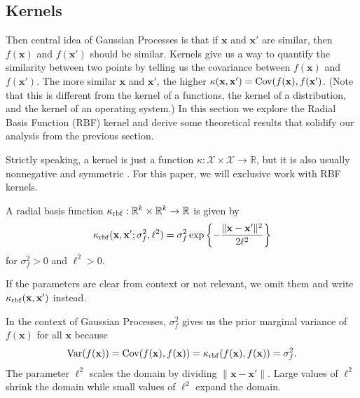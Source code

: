 \subsection{Kernels}

Then central idea of Gaussian Processes is that if $\mathbf{x}$ and $\mathbf{x}'$ are similar, then $f(\mathbf{x})$ and $f(\mathbf{x}')$ should be similar.
Kernels give us a way to quantify the similarity between two points by telling us the covariance between $f(\mathbf{x})$ and $f(\mathbf{x}')$.
The more similar $\mathbf{x}$ and $\mathbf{x}'$, the higher $\kappa(\mathbf{x}, \mathbf{x}') = \operatorname{Cov}(f(\mathbf{x}), f(\mathbf{x}')$.
(Note that this is different from the kernel of a functions, the kernel of a distribution, and the kernel of an operating system.)
In this section we explore the Radial Basis Function (RBF) kernel and derive some theoretical results that solidify our analysis from the previous section.

Strictly speaking, a kernel is just a function $\kappa: \mathcal{X} \times \mathcal{X} \to \mathbb{R}$, but it is also usually nonnegative and symmetric \cite{murphy2012}.
For this paper, we will exclusive work with RBF kernels.

\begin{definition}
    A radial basis function $\kappa_{\mathrm{rbf}}: \mathbb{R}^{k} \times \mathbb{R}^{k} \to \mathbb{R}$
    is given by
    \begin{equation*}
        \kappa_{\mathrm{rbf}}(\mathbf{x}, \mathbf{x}'; \sigma_f^2, \ell^2)
        = \sigma_f^{2} \exp \left\{ - \frac{ \lVert \mathbf{x} - \mathbf{x}' \rVert^2 }{ 2 \ell^2 }\right\}
    \end{equation*}
    for $\sigma_f^2 > 0$ and $\ell^2 > 0$.

    If the parameters are clear from context or not relevant, we omit them and write $\kappa_{\mathrm{rbf}}(\mathbf{x}, \mathbf{x}')$ instead.
\end{definition}
In the context of Gaussian Processes, $\sigma_f^2$ gives us the prior marginal variance of $f(\mathbf{x})$ for all $\mathbf{x}$ because
\begin{equation*}
    \operatorname{Var}(f(\mathbf{x})) = \operatorname{Cov}(f(\mathbf{x}), f(\mathbf{x})) = \kappa_{\mathrm{rbf}}(f(\mathbf{x}), f(\mathbf{x})) = \sigma_f^2.
\end{equation*}
The parameter $\ell^2$ scales the domain by dividing $\lVert \mathbf{x} - \mathbf{x}' \rVert$.
Large values of $\ell^2$ shrink the domain while small values of $\ell^2$ expand the domain.

